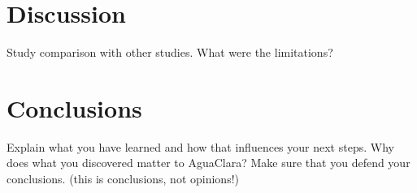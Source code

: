 \documentclass[a4paper]{article}
\begin{document}



\section*{Discussion}
Study comparison with other studies. What were the limitations?

\section*{Conclusions}
Explain what you have learned and how that influences your next steps. Why does what you discovered matter to AguaClara?
Make sure that you defend your conclusions. (this is conclusions, not opinions!)
\end{document}
